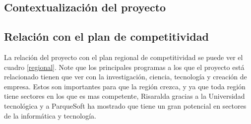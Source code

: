 \documentclass[a4paper, 12pt, oneside]{article}
\begin{document}
	\clearpage
	
	
	\begin{center}
	\section{Contextualización del proyecto}
	\end{center}
	
	\subsection{Relación con el plan de competitividad}
	La relación del proyecto con el plan regional de competitividad se puede ver el cuadro \ref{regional}. Note
	que los principales programas a los que el proyecto está relacionado tienen que ver con la investigación,
	ciencia, tecnología y creación de empresa. Estos son importantes para que la región crezca, y ya que toda
	región tiene sectores en los que es mas competente, Risaralda gracias a la Universidad tecnológica y a
	ParqueSoft ha mostrado que tiene un gran potencial en sectores de la informática y tecnología.
	
\end{document}
